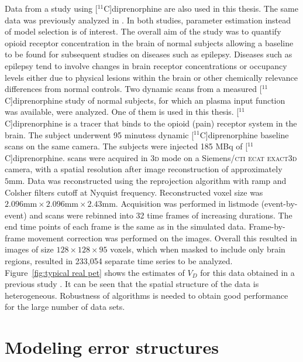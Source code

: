 Data from a \pet study using [$^{11}$C]diprenorphine are also used in this thesis. The same data was previously analyzed in \cite{Peng:2008fx,Jiang:2009kf}. In both studies, parameter estimation instead of model selection is of interest. The overall aim of the study was to quantify opioid receptor concentration in the brain of normal subjects allowing a baseline to be found for subsequent studies on diseases such as epilepsy. Diseases such as epilepsy tend to involve changes in brain receptor concentrations or occupancy levels either due to physical lesions within the brain or other chemically relevance differences from normal controls. Two dynamic scans from a measured [$^{11}$C]diprenorphine study of normal subjects, for which an plasma input function was available, were analyzed. One of them is used in this thesis. [$^{11}$C]diprenorphine is a tracer that binds to the opioid (pain) receptor system in the brain. The subject underwent 95 minutess dynamic [$^{11}$C]diprenorphine \pet baseline scans on the same camera. The subjects were injected 185 MBq of [$^{11}$C]diprenorphine. \pet scans were acquired in \textsc{3d} mode on a Siemens/\textsc{cti ecat exact3d} \pet camera, with a spatial resolution after image reconstruction of approximately $5\text{mm}$. Data was reconstructed using the reprojection algorithm \citep{Kinahan1989} with ramp and Colsher filters cutoff at Nyquist frequency. Reconstructed voxel size was $2.096 \text{mm} \times 2.096 \text{mm} \times2.43 \text{mm}$. Acquisition was performed in listmode (event-by-event) and scans were rebinned into 32 time frames of increasing durations. The end time points of each frame is the same as in the simulated data. Frame-by-frame movement correction was performed on the \pet images. Overall this resulted in images of size $128\times128\times95$ voxels, which when masked to include only brain regions, resulted in 233,054 separate time series to be analyzed. Figure~\ref{fig:typical real pet} shows the estimates of $V_D$ for this data obtained in a previous study \cite{Zhou2013}. It can be seen that the spatial structure of the data is heterogeneous. Robustness of algorithms is needed to obtain good performance for the large number of data sets.



\section{Modeling error structures}
\label{sec:Error models}

